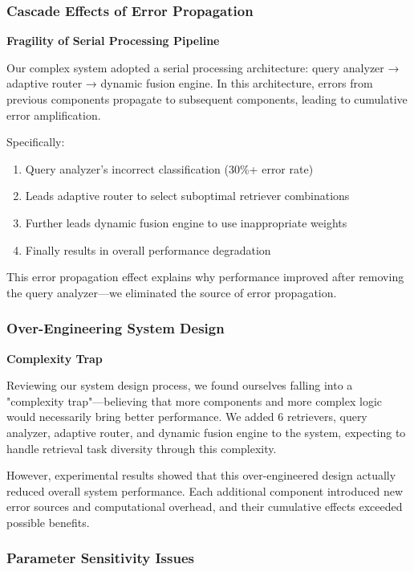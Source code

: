 \documentclass[letterpaper]{article} %
\begin{document}
\subsubsection{Cascade Effects of Error Propagation}

\textbf{Fragility of Serial Processing Pipeline}

Our complex system adopted a serial processing architecture: query analyzer → adaptive router → dynamic fusion engine. In this architecture, errors from previous components propagate to subsequent components, leading to cumulative error amplification.

Specifically:
\begin{enumerate}
\item Query analyzer's incorrect classification (30\%+ error rate)
\item Leads adaptive router to select suboptimal retriever combinations
\item Further leads dynamic fusion engine to use inappropriate weights
\item Finally results in overall performance degradation
\end{enumerate}

This error propagation effect explains why performance improved after removing the query analyzer—we eliminated the source of error propagation.

\subsubsection{Over-Engineering System Design}

\textbf{Complexity Trap}

Reviewing our system design process, we found ourselves falling into a "complexity trap"—believing that more components and more complex logic would necessarily bring better performance. We added 6 retrievers, query analyzer, adaptive router, and dynamic fusion engine to the system, expecting to handle retrieval task diversity through this complexity.

However, experimental results showed that this over-engineered design actually reduced overall system performance. Each additional component introduced new error sources and computational overhead, and their cumulative effects exceeded possible benefits.

\subsubsection{Parameter Sensitivity Issues}
\end{document}
